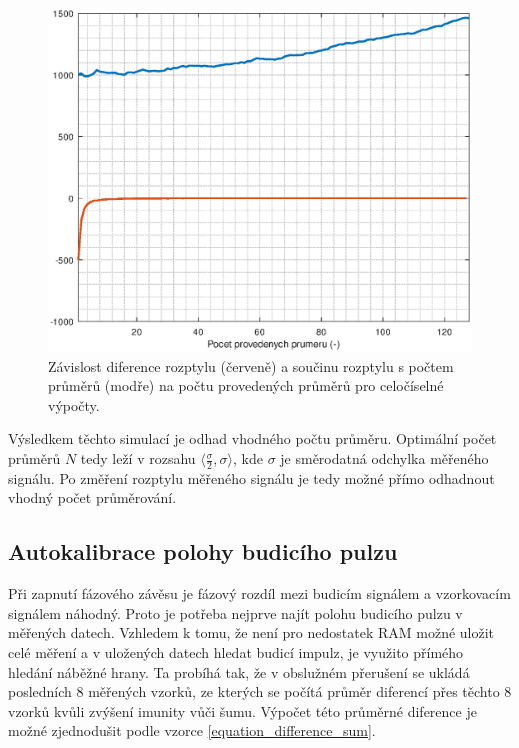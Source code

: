 \begin{figure}[htbp]
\includegraphics[width=\textwidth,keepaspectratio]{images/averaging_integer_difference_error.eps}\caption{Závislost diference rozptylu (červeně) a součinu rozptylu s počtem průměrů (modře) na počtu provedených průměrů pro celočíselné výpočty.}\label{averaging_float_difference_error}
\end{figure}

Výsledkem těchto simulací je odhad vhodného počtu průměru. Optimální počet průměrů $N$ tedy leží v rozsahu $\langle\frac{\sigma}{2}, \sigma \rangle$, kde $\sigma$ je směrodatná odchylka měřeného signálu. Po změření rozptylu měřeného signálu je tedy možné přímo odhadnout vhodný počet průměrování.

\subsection{Autokalibrace polohy budicího pulzu}
Při zapnutí fázového závěsu je fázový rozdíl mezi budicím signálem a vzorkovacím signálem náhodný. Proto je potřeba nejprve najít polohu budicího pulzu v měřených datech. Vzhledem k tomu, že není pro nedostatek RAM možné uložit celé měření a v uložených datech hledat budicí impulz, je využito přímého hledání náběžné hrany. Ta probíhá tak, že v obslužném přerušení se ukládá posledních 8 měřených vzorků, ze kterých se počítá průměr diferencí přes těchto 8 vzorků kvůli zvýšení imunity vůči šumu. Výpočet této průměrné diference je možné zjednodušit podle vzorce \ref{equation_difference_sum}. 

